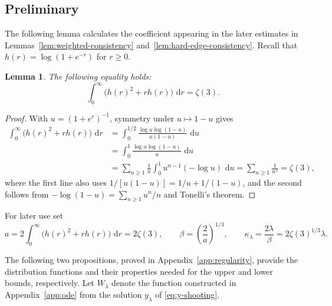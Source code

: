 \documentclass[12pt,preprint]{amsart}
\numberwithin{equation}{section}
\theoremstyle{plain}
\newtheorem{lemma}[theorem]{Lemma}
\theoremstyle{definition}
\newcommand{\dd}{\,\mathrm d}
\begin{document}
\subsection{Preliminary}

The following lemma calculates the coefficient appearing in the later
estimates in Lemmas~\ref{lem:weighted-consistency}
and~\ref{lem:hard-edge-consistency}.
Recall that \(h(r)=\log(1+e^{-r})\) for \(r\ge0\).

\begin{lemma}
\label{lem:diffusion-coefficient}
The following equality holds:
\begin{equation*}
\int_0^\infty\bigl(h(r)^2+rh(r)\bigr)\,\dd r=\zeta(3).
\end{equation*}

\end{lemma}

\begin{proof}

With $u=(1+e^r)^{-1}$, symmetry under $u\mapsto1-u$ gives
\[
\begin{aligned}
\int_0^\infty\bigl(h(r)^2+rh(r)\bigr)\,\dd r
 &=\int_0^{1/2}
   \frac{\log u\log(1-u)}{u(1-u)}\,\dd u
 \\&=\int_0^1\frac{\log u\log(1-u)}u\,\dd u\\
 &=\sum_{n\ge1}\frac1n
   \int_0^1u^{n-1}(-\log u)\,\dd u
 =\sum_{n\ge1}\frac1{n^3}
 =\zeta(3),
\end{aligned}
\]
where the first line also uses
$1/[u(1-u)]=1/u+1/(1-u)$, and the second follows from
$-\log(1-u)=\sum_{n\ge1}u^n/n$ and Tonelli's theorem.
\end{proof}

For later use set
\begin{equation}
 a=2\int_0^\infty\bigl(h(r)^2+rh(r)\bigr)\,\dd r=2\zeta(3), \qquad
 \beta=\left(\frac2a\right)^{1/3},
 \qquad
 \kappa_{\lambda}=\frac{2\lambda}{\beta}=2\zeta(3)^{1/3}\lambda.
 \label{eq:beta-kappa}
\end{equation}


The following two propositions, proved in Appendix~\ref{app:regularity},
provide the distribution functions and their properties needed for the upper
and lower bounds, respectively.  Let $W_\lambda$ denote the function
constructed in Appendix~\ref{app:ode} from the solution $y_\lambda$ of
\eqref{eq:y-shooting}.
\end{document}
